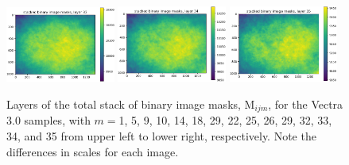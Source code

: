 \documentclass[letterpaper,11pt]{article}
\newcommand{\Mu}{\mathrm{M}}
\begin{document}
\begin{figure}[!ht]
\includegraphics[width=0.32\textwidth]{images/measuring_flatfield_corrections/mask_stack_layers_vectra/mask_stack_layer_33}
\includegraphics[width=0.32\textwidth]{images/measuring_flatfield_corrections/mask_stack_layers_vectra/mask_stack_layer_34}
\includegraphics[width=0.32\textwidth]{images/measuring_flatfield_corrections/mask_stack_layers_vectra/mask_stack_layer_35}
\caption{\footnotesize Layers of the total stack of binary image masks, $\Mu_{ijm}$, for the Vectra 3.0 samples, with $m=$1, 5, 9, 10, 14, 18, 29, 22, 25, 26, 29, 32, 33, 34, and 35 from upper left to lower right, respectively. Note the differences in scales for each image.}
\label{fig:mask_stack_layers_vectra}
\end{figure}
\end{document}
